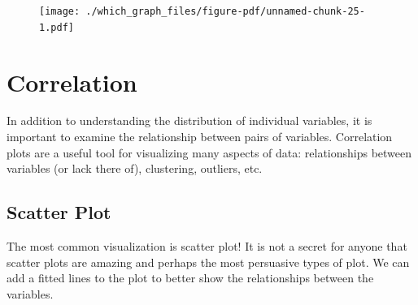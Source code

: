 \documentclass[
  letterpaper,
]{book}
\begin{document}
\begin{figure}[H]

{\centering \texttt{[image: ./which\_graph\_files/figure-pdf/unnamed-chunk-25-1.pdf]}

}

\end{figure}

\hypertarget{correlation}{%
\section{Correlation}\label{correlation}}

In addition to understanding the distribution of individual variables,
it is important to examine the relationship between pairs of variables.
Correlation plots are a useful tool for visualizing many aspects of
data: relationships between variables (or lack there of), clustering,
outliers, etc.

\hypertarget{scatter-plot}{%
\subsection{Scatter Plot}\label{scatter-plot}}

The most common visualization is scatter plot! It is not a secret for
anyone that scatter plots are amazing and perhaps the most persuasive
types of plot. We can add a fitted lines to the plot to better show the
relationships between the variables.
\end{document}
